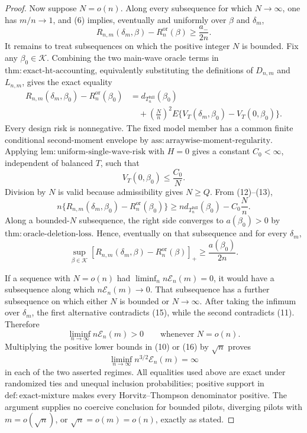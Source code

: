 \documentclass{article}
\begin{document}
\begin{proof}
Now suppose \(N=o(n)\).  Along every subsequence for which \(N\to\infty\), one has \(m/n\to1\), and (6) implies, eventually and uniformly over \(\beta\) and \(\delta_m\),
\[
R_{n,m}(\delta_m,\beta)-R_n^{\mathrm{or}}(\beta)
\geq\frac{a_-}{2n}.
\tag{11}
\]
It remains to treat subsequences on which the positive integer \(N\) is bounded.  Fix any \(\beta_0\in\mathcal K\).  Combining the two main-wave oracle terms in \(\mathrm{thm{:}exact\text{-}ht\text{-}accounting}\), equivalently substituting the definitions of \(D_{n,m}\) and \(L_{n,m}\), gives the exact equality
\[
\begin{aligned}
R_{n,m}(\delta_m,\beta_0)-R_n^{\mathrm{or}}(\beta_0)
&=d_{T_n^{\mathrm{full}}}(\beta_0)\\
&\quad+\left(\frac Nn\right)^2
E\{V_T(\delta_m,\beta_0)-V_T(0,\beta_0)\}.
\end{aligned}
\tag{12}
\]
Every design risk is nonnegative.  The fixed model member has a common finite conditional second-moment envelope by \(\mathrm{ass{:}arraywise\text{-}moment\text{-}regularity}\).  Applying \(\mathrm{lem{:}uniform\text{-}single\text{-}wave\text{-}risk}\) with \(H=0\) gives a constant \(C_0<\infty\), independent of balanced \(T\), such that
\[
V_T(0,\beta_0)\leq\frac{C_0}{N}.
\tag{13}
\]
Division by \(N\) is valid because admissibility gives \(N\geq Q\).  From (12)--(13),
\[
n\{R_{n,m}(\delta_m,\beta_0)-R_n^{\mathrm{or}}(\beta_0)\}
\geq n d_{T_n^{\mathrm{full}}}(\beta_0)-C_0\frac Nn.
\tag{14}
\]
Along a bounded-\(N\) subsequence, the right side converges to \(a(\beta_0)>0\) by \(\mathrm{thm{:}oracle\text{-}deletion\text{-}loss}\).  Hence, eventually on that subsequence and for every \(\delta_m\),
\[
\sup_{\beta\in\mathcal K}
[R_{n,m}(\delta_m,\beta)-R_n^{\mathrm{or}}(\beta)]_+
\geq\frac{a(\beta_0)}{2n}.
\tag{15}
\]

If a sequence with \(N=o(n)\) had \(\liminf_n n\mathcal E_n(m)=0\), it would have a subsequence along which \(n\mathcal E_n(m)\to0\).  That subsequence has a further subsequence on which either \(N\) is bounded or \(N\to\infty\).  After taking the infimum over \(\delta_m\), the first alternative contradicts (15), while the second contradicts (11).  Therefore
\[
\liminf_{n\to\infty}n\mathcal E_n(m)>0
\qquad\text{whenever }N=o(n).
\tag{16}
\]
Multiplying the positive lower bounds in (10) or (16) by \(\sqrt n\) proves
\[
\liminf_{n\to\infty}n^{3/2}\mathcal E_n(m)=\infty
\tag{17}
\]
in each of the two asserted regimes.  All equalities used above are exact under randomized ties and unequal inclusion probabilities; positive support in \(\mathrm{def{:}exact\text{-}mixture}\) makes every Horvitz--Thompson denominator positive.  The argument supplies no coercive conclusion for bounded pilots, diverging pilots with \(m=o(\sqrt n)\), or \(\sqrt n=o(m)=o(n)\), exactly as stated.
\end{proof}
\end{document}
